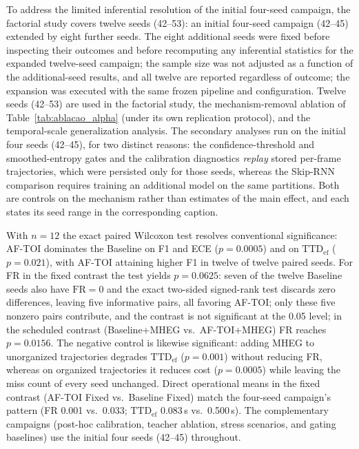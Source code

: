 \documentclass[a4paper,fleqn]{cas-dc}
\begin{document}
{\color{\revcolor}To address the limited inferential resolution of the
initial four-seed campaign, the factorial study covers twelve seeds (42--53): an initial four-seed
campaign (42--45) extended by eight further seeds.
The eight additional seeds were fixed before inspecting their outcomes and
before recomputing any inferential statistics for the expanded twelve-seed
campaign; the sample size was not adjusted as a function of the
additional-seed results, and all twelve are reported regardless of outcome; the expansion
was executed with the same frozen pipeline and configuration.
{\color{\revcolor}Twelve seeds (42--53) are used in the factorial study, the
mechanism-removal ablation of Table~\ref{tab:ablacao_alpha} (under its own
replication protocol), and the temporal-scale generalization analysis. The secondary analyses run on the
initial four seeds (42--45), for two distinct reasons: the confidence-threshold
and smoothed-entropy gates and the calibration diagnostics \emph{replay} stored
per-frame trajectories, which were persisted only for those seeds, whereas the
Skip-RNN comparison requires training an additional model on the same
partitions. Both are controls on the mechanism rather than estimates of the
main effect, and each states its seed range in the corresponding caption.}

With $n=12$ the exact
paired Wilcoxon test resolves conventional significance:
\mbox{AF-TOI} dominates the Baseline on F1 and ECE ($p=0.0005$) and on
$\mathrm{TTD}_{\mathrm{ef}}$ ($p=0.021$), with \mbox{AF-TOI} attaining higher
F1 in twelve of twelve paired seeds. For FR in the fixed contrast the test
yields $p=0.0625$: seven of the twelve Baseline seeds also have $\mathrm{FR}=0$
and the exact two-sided signed-rank test discards zero differences, leaving
five informative pairs, all favoring \mbox{AF-TOI}; only these five nonzero
pairs contribute, and the contrast is not significant at the 0.05 level; in the scheduled contrast (Baseline+MHEG vs.\
\mbox{AF-TOI}+MHEG) FR reaches $p=0.0156$. The negative control is likewise
significant: adding \mbox{MHEG} to unorganized trajectories degrades
$\mathrm{TTD}_{\mathrm{ef}}$ ($p=0.001$) without reducing FR, whereas on
organized trajectories it reduces cost ($p=0.0005$) while leaving the miss
count of every seed unchanged. Direct operational means in the fixed contrast
(\mbox{AF-TOI} Fixed vs.\ Baseline Fixed) match the four-seed campaign's
pattern (FR 0.001 vs.\ 0.033; $\mathrm{TTD}_{\mathrm{ef}}$ 0.083\,s vs.\
0.500\,s). The complementary campaigns (post-hoc calibration, teacher
ablation, stress scenarios, and gating baselines) use the initial four
seeds (42--45) throughout.}
\end{document}
